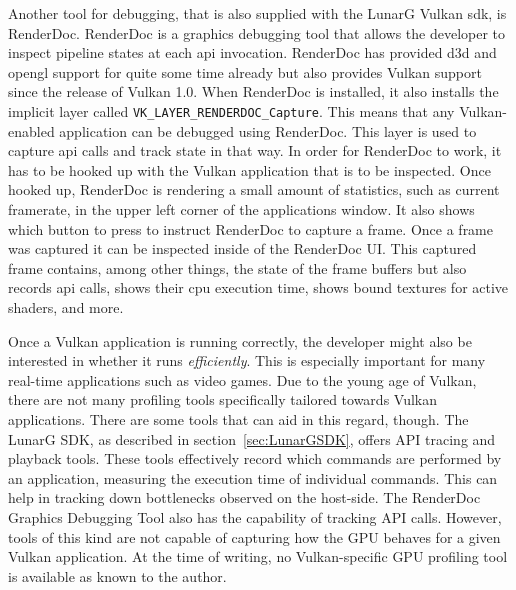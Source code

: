     Another tool for debugging, that is also supplied with the LunarG Vulkan \gls{sdk}, is RenderDoc\cite{renderdoc}.
    RenderDoc is a graphics debugging tool that allows the developer to inspect pipeline states at each \gls{api} invocation.
    RenderDoc has provided \gls{d3d} and \gls{opengl} support for quite some time already but also provides Vulkan support since the release of Vulkan 1.0.
    When RenderDoc is installed, it also installs the implicit layer called \lstinline{VK_LAYER_RENDERDOC_Capture}.
    This means that any Vulkan-enabled application can be debugged using RenderDoc.
    This layer is used to capture \gls{api} calls and track state in that way.
    In order for RenderDoc to work, it has to be hooked up with the Vulkan application that is to be inspected.
    Once hooked up, RenderDoc is rendering a small amount of statistics, such as current framerate, in the upper left corner of the applications window.
    It also shows which button to press to instruct RenderDoc to capture a frame.
    Once a frame was captured it can be inspected inside of the RenderDoc UI.
    This captured frame contains, among other things, the state of the frame buffers but also records \gls{api} calls, shows their \gls{cpu} execution time, shows bound textures for active shaders, and more.

    Once a Vulkan application is running correctly, the developer might also be interested in whether it runs \textit{efficiently}.
    This is especially important for many real-time applications such as video games.
    Due to the young age of Vulkan, there are not many profiling tools specifically tailored towards Vulkan applications.
    There are some tools that can aid in this regard, though.
    The LunarG SDK, as described in section~\ref{sec:LunarGSDK}, offers API tracing and playback tools.
    These tools effectively record which commands are performed by an application, measuring the execution time of individual commands.
    This can help in tracking down bottlenecks observed on the host-side.
    The RenderDoc Graphics Debugging Tool\cite{renderdoc} also has the capability of tracking API calls.
    However, tools of this kind are not capable of capturing how the GPU behaves for a given Vulkan application.
    At the time of writing, no Vulkan-specific GPU profiling tool is available as known to the author.


